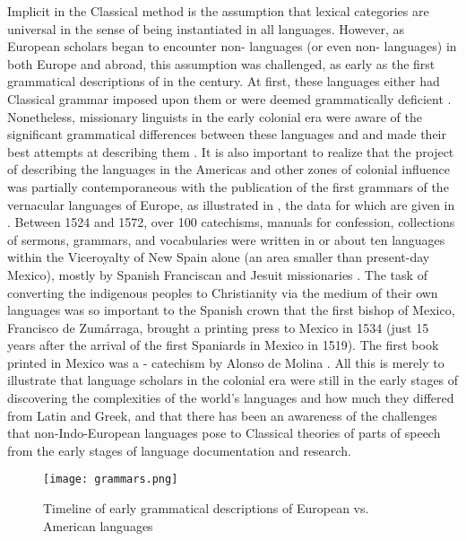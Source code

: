 Implicit in the Classical method is the assumption that lexical categories are universal in the sense of being instantiated in all languages. However, as European scholars began to encounter non- languages (or even non- languages) in both Europe and abroad, this assumption was challenged, as early as the first grammatical descriptions of  in the  century. At first, these languages either had Classical grammar imposed upon them or were deemed grammatically deficient \parencite[3]{Suarez1983}. Nonetheless, missionary linguists in the early colonial era were aware of the significant grammatical differences between these languages and  and made their best attempts at describing them \parencite[3--4]{Suarez1983}. It is also important to realize that the project of describing the languages in the Americas and other zones of colonial influence was partially contemporaneous with the publication of the first grammars of the vernacular languages of Europe, as illustrated in , the data for which are given in . Between 1524 and 1572, over 100 catechisms, manuals for confession, collections of sermons, grammars, and vocabularies were written in or about ten languages within the Viceroyalty of New Spain alone (an area smaller than present-day Mexico), mostly by Spanish Franciscan and Jesuit missionaries \parencite[2]{Suarez1983}. The task of converting the indigenous peoples to Christianity via the medium of their own languages was so important to the Spanish crown that the first bishop of Mexico, Francisco de Zumárraga, brought a printing press to Mexico in 1534 (just 15 years after the arrival of the first Spaniards in Mexico in 1519). The first book printed in Mexico was a - catechism by Alonso de Molina \parencite[2]{Suarez1983}. All this is merely to illustrate that language scholars in the colonial era were still in the early stages of discovering the complexities of the world's languages and how much they differed from Latin and Greek, and that there has been an awareness of the challenges that non-Indo-European languages pose to Classical theories of parts of speech from the early stages of language documentation and research.

\begin{figure}
  \texttt{[image: grammars.png]}
  \caption{Timeline of early grammatical descriptions of European vs. American languages}
  \label{fig:grammars}
\end{figure}

